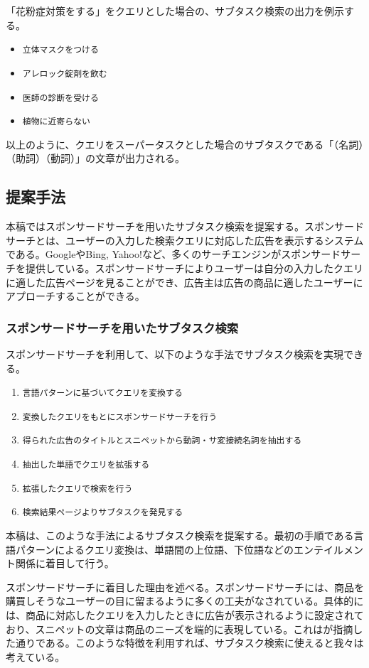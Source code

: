 \documentclass[submit,techreq]{ipsj}
\def\|{\verb|}
\begin{document}
「花粉症対策をする」をクエリとした場合の、サブタスク検索の出力を例示する。

\begin{itemize}
\item \|立体マスクをつける|
\item \|アレロック錠剤を飲む|
\item \|医師の診断を受ける|
\item \|植物に近寄らない|
\end{itemize}

以上のように、クエリをスーパータスクとした場合のサブタスクである「（名詞）（助詞）（動詞）」の文章が出力される。

\subsection{提案手法}
本稿ではスポンサードサーチを用いたサブタスク検索を提案する。スポンサードサーチとは、ユーザーの入力した検索クエリに対応した広告を表示するシステムである。GoogleやBing, Yahoo!など、多くのサーチエンジンがスポンサードサーチを提供している。スポンサードサーチによりユーザーは自分の入力したクエリに適した広告ページを見ることができ、広告主は広告の商品に適したユーザーにアプローチすることができる。


\subsubsection{スポンサードサーチを用いたサブタスク検索}
スポンサードサーチを利用して、以下のような手法でサブタスク検索を実現できる。

\begin{enumerate}
\item \|言語パターンに基づいてクエリを変換する|
\item \|変換したクエリをもとにスポンサードサーチを行う|
\item \|得られた広告のタイトルとスニペットから動詞・サ変接続名詞を抽出する|
\item \|抽出した単語でクエリを拡張する|
\item \|拡張したクエリで検索を行う|
\item \|検索結果ページよりサブタスクを発見する|
\end{enumerate}

本稿は、このような手法によるサブタスク検索を提案する。最初の手順である言語パターンによるクエリ変換は、単語間の上位語、下位語などのエンテイルメント関係に着目して行う。


スポンサードサーチに着目した理由を述べる。スポンサードサーチには、商品を購買しそうなユーザーの目に留まるように多くの工夫がなされている。具体的には、商品に対応したクエリを入力したときに広告が表示されるように設定されており、スニペットの文章は商品のニーズを端的に表現している。これは\cite{yamatake}が指摘した通りである。このような特徴を利用すれば、サブタスク検索に使えると我々は考えている。
\end{document}
